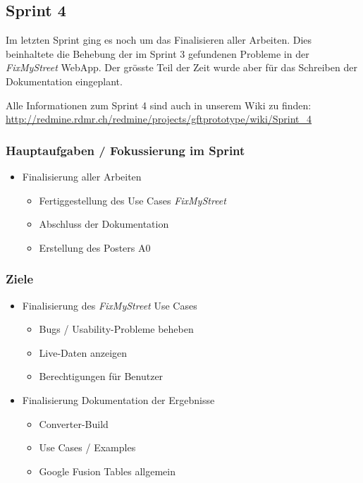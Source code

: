 \subsection{Sprint 4}

Im letzten Sprint ging es noch um das Finalisieren aller Arbeiten. Dies beinhaltete die Behebung der im Sprint 3 gefundenen Probleme in der \emph{FixMyStreet} \gls{WebApp}. Der grösste Teil der Zeit wurde aber für das Schreiben der Dokumentation eingeplant. 

Alle Informationen zum Sprint 4 sind auch in unserem Wiki zu finden:
\url{http://redmine.rdmr.ch/redmine/projects/gftprototype/wiki/Sprint_4}

\subsubsection{Hauptaufgaben / Fokussierung im Sprint}
\begin{itemize}
	\item Finalisierung aller Arbeiten
	\begin{itemize}
		\item Fertiggestellung des Use Cases \emph{FixMyStreet}
		\item Abschluss der Dokumentation
		\item Erstellung des Posters A0
	\end{itemize}
\end{itemize}

\subsubsection{Ziele}
\begin{itemize}
	\item Finalisierung des \emph{FixMyStreet} Use Cases
	\begin{itemize}
		\item Bugs / Usability-Probleme beheben
		\item Live-Daten anzeigen
		\item Berechtigungen für Benutzer
	\end{itemize}
	
	\item Finalisierung Dokumentation der Ergebnisse
	\begin{itemize}
		\item Converter-Build
		\item Use Cases / Examples
		\item Google Fusion Tables allgemein
	\end{itemize}
\end{itemize}

